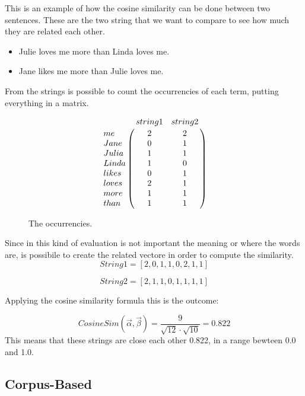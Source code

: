 This is an example of how the cosine similarity can be done  between two sentences.
These are the two string that we want to compare to see how much they are related each other.

\begin{itemize}
\item Julie loves me more than Linda loves me.
\item Jane likes me more than Julie loves me.
\end{itemize}
\newpage
From the strings is possible to count the occurrencies of each term, putting everything in a matrix.
\begin{figure}
	\begin{equation} \nonumber
	\bordermatrix{~ & string 1 & string 2 \cr	
		me 		& 2 & 2  \cr 
		Jane		& 0 & 1  \cr  
		Julia		& 1 & 1  \cr
		Linda 		& 1 & 0  \cr 
		likes		& 0 & 1  \cr
		loves		& 2 & 1  \cr
		more		& 1 & 1  \cr
		than		& 1 & 1  \cr	}
	\end{equation}
	\caption{The occurrencies.}
	\label{fig:TDM}
\end{figure}

Since in this kind of evaluation is not important the meaning or where the words are, is possibile to create the related vectore in order to compute the similarity.\\

	\begin{equation} \nonumber
	String1 = [2, 0, 1, 1, 0, 2, 1, 1]
	\end{equation}

	\begin{equation} \nonumber
	String2 = [2, 1, 1, 0, 1, 1, 1, 1]
	\end{equation}

Applying the cosine similarity formula this is the outcome:

\begin{equation} \label{eqn:Cosine}
CosineSim(\vec{\alpha},\vec{\beta}) = \frac{9}{\sqrt{12}\cdot \sqrt{10}} = 0.822
\end{equation}
This means that these strings are close each other 0.822, in a range bewteen 0.0 and 1.0.

\subsection{Corpus-Based}
